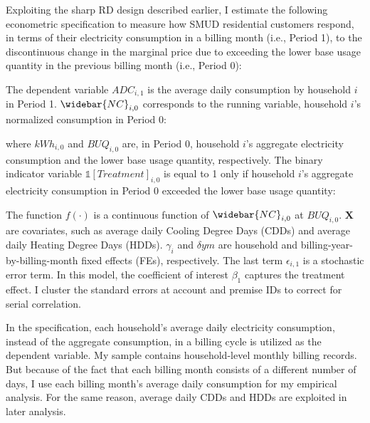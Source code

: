 Exploiting the sharp RD design described earlier, I estimate the following econometric specification to measure how SMUD residential customers respond, in terms of their electricity consumption in a billing month (i.e., Period 1), to the discontinuous change in the marginal price due to exceeding the lower base usage quantity in the previous billing month (i.e., Period 0):

The dependent variable $ADC_{i, 1}$ is the average daily consumption by household $i$ in Period 1. $\widebar{NC}_{i, 0}$ corresponds to the running variable, household $i$'s normalized consumption in Period 0:

where $kWh_{i, 0}$ and $BUQ_{i, 0}$ are, in Period 0, household $i$'s aggregate electricity consumption and the lower base usage quantity, respectively. The binary indicator variable $\mathbb{1}[Treatment]_{i, 0}$ is equal to 1 only if household $i$'s aggregate electricity consumption in Period 0 exceeded the lower base usage quantity:

The function $f\left( \cdot \right)$ is a continuous function of $\widebar{NC}_{i, 0}$ at $BUQ_{i, 0}$. $\boldsymbol{X}$ are covariates, such as average daily Cooling Degree Days (CDDs) and average daily Heating Degree Days (HDDs). $\gamma_{i}$ and $\delta{ym}$ are household and billing-year-by-billing-month fixed effects (FEs), respectively. The last term $\epsilon_{i, 1}$ is a stochastic error term. In this model, the coefficient of interest $\beta_{1}$ captures the treatment effect. I cluster the standard errors at account and premise IDs to correct for serial correlation. 

In the specification, each household's average daily electricity consumption, instead of the aggregate consumption, in a billing cycle is utilized as the dependent variable. My sample contains household-level monthly billing records. But because of the fact that each billing month consists of a different number of days, I use each billing month's average daily consumption for my empirical analysis. For the same reason, average daily CDDs and HDDs are exploited in later analysis. 
